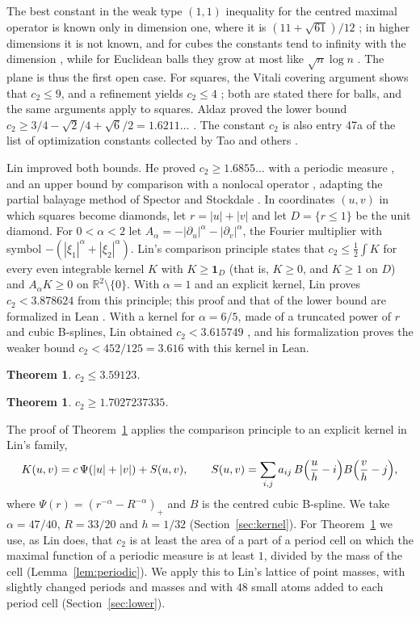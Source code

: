\documentclass[11pt]{amsart}
\newtheorem{theorem}[equation]{Theorem}
\theoremstyle{definition}
\theoremstyle{remark}
\numberwithin{equation}{section}
\newcommand{\R}{\mathbb{R}}
\newcommand{\CBOUND}{3.59123}
\newcommand{\ALPHA}{47/40}
\newcommand{\RR}{33/20}
\newcommand{\HH}{1/32}
\newcommand{\LBDEC}{1.7027237335}
\begin{document}
The best constant in the weak type $(1,1)$ inequality for the centred maximal operator is known only in dimension one, where it is $(11+\sqrt{61})/12$ \cite{Mel03}; in higher dimensions it is not known, and for cubes the constants tend to infinity with the dimension \cite{Ald11}, while for Euclidean balls they grow at most like $\sqrt n\log n$ \cite{SS26}. The plane is thus the first open case. For squares, the Vitali covering argument shows that $c_2\le9$, and a refinement yields $c_2\le4$ \cite[Exercise~42]{Tao10}; both are stated there for balls, and the same arguments apply to squares. Aldaz proved the lower bound $c_2\ge3/4-\sqrt2/4+\sqrt6/2=1.6211\ldots$ \cite{Ald00}. The constant $c_2$ is also entry 47a of the list of optimization constants collected by Tao and others \cite{Tao26}.

Lin improved both bounds. He proved $c_2\ge1.6855\ldots$ with a periodic measure \cite{Lin26b}, and an upper bound by comparison with a nonlocal operator \cite{Lin26a}, adapting the partial balayage method of Spector and Stockdale \cite{SS26}. In coordinates $(u,v)$ in which squares become diamonds, let $r=|u|+|v|$ and let $D=\{r\le1\}$ be the unit diamond. For $0<\alpha<2$ let $A_\alpha=-|\partial_u|^\alpha-|\partial_v|^\alpha$, the Fourier multiplier with symbol $-(|\xi_1|^\alpha+|\xi_2|^\alpha)$. Lin's comparison principle states that $c_2\le\frac12\int K$ for every even integrable kernel $K$ with $K\ge\mathbf 1_D$ (that is, $K\ge0$, and $K\ge1$ on $D$) and $A_\alpha K\ge0$ on $\R^2\setminus\{0\}$. With $\alpha=1$ and an explicit kernel, Lin proves $c_2<3.878624$ from this principle; this proof and that of the lower bound are formalized in Lean \cite{Lin26b}. With a kernel for $\alpha=6/5$, made of a truncated power of $r$ and cubic B-splines, Lin obtained $c_2<3.615749$ \cite{Lin26a,Lin26c}, and his formalization \cite{Lin26d} proves the weaker bound $c_2<452/125=3.616$ with this kernel in Lean.

\begin{theorem}\label{thm:main}
$c_2\le\CBOUND$.
\end{theorem}

\begin{theorem}\label{thm:lower}
$c_2\ge\LBDEC$.
\end{theorem}

The proof of Theorem~\ref{thm:main} applies the comparison principle to an explicit kernel in Lin's family,
\begin{equation}\label{eq:kernel}
K(u,v)=c\,\Psi(|u|+|v|)+S(u,v),\qquad S(u,v)=\sum_{i,j}a_{ij}\,B\Bigl(\frac uh-i\Bigr)B\Bigl(\frac vh-j\Bigr),
\end{equation}
where $\Psi(r)=(r^{-\alpha}-R^{-\alpha})_+$ and $B$ is the centred cubic B-spline. We take $\alpha=\ALPHA$, $R=\RR$ and $h=\HH$ (Section~\ref{sec:kernel}). For Theorem~\ref{thm:lower} we use, as Lin does, that $c_2$ is at least the area of a part of a period cell on which the maximal function of a periodic measure is at least $1$, divided by the mass of the cell (Lemma~\ref{lem:periodic}). We apply this to Lin's lattice of point masses, with slightly changed periods and masses and with $48$ small atoms added to each period cell (Section~\ref{sec:lower}).
\end{document}
